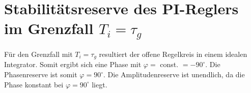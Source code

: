 \section{Stabilitätsreserve des PI-Reglers im Grenzfall $T_i = \tau_g$}
Für den Grenzfall mit $T_i = \tau_g$ resultiert der offene Regelkreis in
einem idealen Integrator. Somit ergibt sich eine Phase mit
$\varphi =$ const. $= -90^{\circ}$. Die Phasenreserve ist somit 
$\varphi = 90^{\circ}$. Die Amplitudenreserve ist unendlich, da die
Phase konstant bei $\varphi = 90^{\circ}$ liegt.

